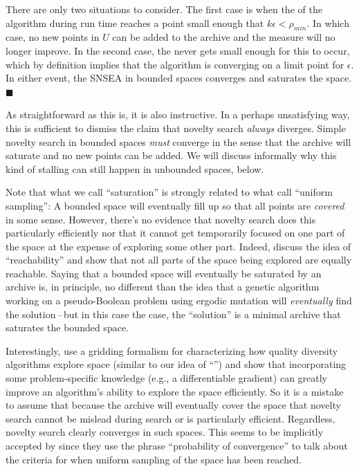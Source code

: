 \documentclass[twoside]{article}
\begin{document}
There are only two situations to consider.  The first case is when the  of the algorithm during run time reaches a point small enough that $k\epsilon < \rho_{min}$.  In which case, no new points in $U$ can be added to the archive and the  measure will no longer improve.  In the second case, the  never gets small enough for this to occur, which by definition implies that the algorithm is converging on a limit point for $\epsilon$.  In either event, the SNSEA in bounded spaces converges and saturates the space. $\blacksquare$

\vspace*{1ex}

As straightforward as this is, it is also instructive.  In a perhaps unsatisfying way, this is sufficient to dismiss the claim that novelty search \emph{always} diverges.  Simple novelty search in bounded spaces \emph{must} converge in the sense that the archive will saturate and no new points can be added.  We will discuss informally why this kind of stalling can still happen in unbounded spaces, below.

Note that what we call ``saturation'' is strongly related to what \citet{Doncieux2019gecco} call ``uniform sampling'':  A bounded space will eventually fill up so that all points are \emph{covered} in some sense.  However, there's no evidence that novelty search does this particularly efficiently nor that it cannot get temporarily focused on one part of the space at the expense of exploring some other part. Indeed, \citet{Doncieux2019gecco} discuss the idea of ``reachability'' and show that not all parts of the space being explored are equally reachable.  Saying that a bounded space will eventually be saturated by an archive is, in principle, no different than the idea that a genetic algorithm working on a pseudo-Boolean problem using ergodic mutation will \emph{eventually} find the solution\,--\,but in this case the case, the ``solution'' is a minimal  archive that saturates the bounded space.

Interestingly, \citet{Fontaine2021corr} use a gridding formalism for characterizing how quality diversity algorithms explore space (similar to our idea of ``'') and show that incorporating some problem-specific knowledge (e.g., a differentiable gradient) can greatly improve an algorithm's ability to explore the space efficiently.  So it is a mistake to assume that because the archive will eventually cover the space that novelty search cannot be mislead during search or is particularly efficient.  Regardless, novelty search clearly converges in such spaces.  This seems to be implicitly accepted by \citet{Doncieux2019gecco} since they use the phrase ``probability of convergence'' to talk about the criteria for when uniform sampling of the space has been reached.
\end{document}
